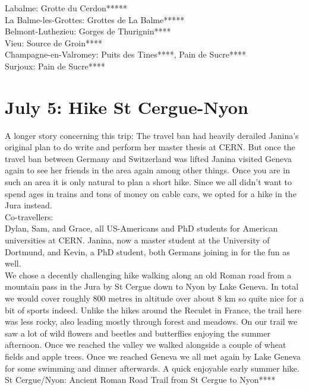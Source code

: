 Labalme: Grotte du Cerdon*****\\
La Balme-les-Grottes: Grottes de La Balme*****\\
Belmont-Luthezieu: Gorges de Thurignin****\\
Vieu: Source de Groin****\\
Champagne-en-Valromey: Puits des Tines****, Pain de Sucre****\\
Surjoux: Pain de Sucre****\\


 \section{July 5: Hike St Cergue-Nyon}
\label{2020:StCergue}

A longer story concerning this trip: The travel ban had heavily derailed Janina's original plan to do write and perform her master thesis at CERN. But once the travel ban between Germany and Switzerland was lifted Janina visited Geneva again to see her friends in the area again among other things. Once you are in such an area it is only natural to plan a short hike. Since we all didn't want to spend ages in trains and tons of money on cable cars, we opted for a hike in the Jura instead.\\

Co-travellers:\\
Dylan, Sam, and Grace, all US-Americans and PhD students for American universities at CERN. Janina, now a master student at the University of Dortmund, and Kevin, a PhD student, both Germans joining in for the fun as well.\\

We chose a decently challenging hike walking along an old Roman road from a mountain pass in the Jura by St Cergue down to Nyon by Lake Geneva. In total we would cover roughly 800 metres in altitude over about 8 km so quite nice for a bit of sports indeed. Unlike the hikes around the Reculet in France, the trail here was less rocky, also leading mostly through forest and meadows. On our trail we saw a lot of wild flowers and beetles and butterflies enjoying the summer afternoon. Once we reached the valley we walked alongside a couple of wheat fields and apple trees. Once we reached Geneva we all met again by Lake Geneva for some swimming and dinner afterwards. A quick enjoyable early summer hike.\\

St Cergue/Nyon: Ancient Roman Road Trail from St Cergue to Nyon****\\

